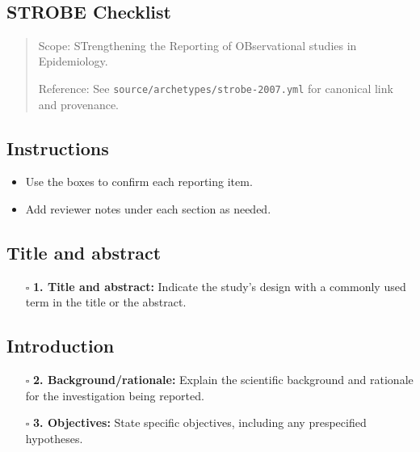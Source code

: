 \documentclass[11pt]{article}
\def\tightlist{}
\begin{document}
\begin{center}
{\LARGE }\\[4pt]
\normalsize 
\end{center}
\vspace{1em}

\begin{Form}

\section{STROBE Checklist}\label{strobe-checklist}

\begin{quote}
Scope: STrengthening the Reporting of OBservational studies in
Epidemiology.

Reference: See \texttt{source/archetypes/strobe-2007.yml} for canonical
link and provenance.
\end{quote}

\subsection{Instructions}\label{instructions}

\begin{itemize}
\tightlist
\item
  Use the boxes to confirm each reporting item.
\item
  Add reviewer notes under each section as needed.
\end{itemize}

\subsection{Title and abstract}\label{title-and-abstract}

\begin{itemize}
\tightlist
\item[$\square$]
  \textbf{1. Title and abstract:} Indicate the study's design with a
  commonly used term in the title or the abstract.
\end{itemize}

\subsection{Introduction}\label{introduction}

\begin{itemize}
\tightlist
\item[$\square$]
  \textbf{2. Background/rationale:} Explain the scientific background
  and rationale for the investigation being reported.
\item[$\square$]
  \textbf{3. Objectives:} State specific objectives, including any
  prespecified hypotheses.
\end{itemize}


\end{Form}
\end{document}
